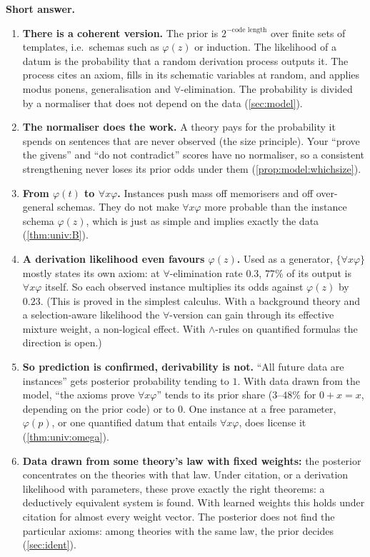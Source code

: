 \begin{framed}\small
\noindent\textbf{Short answer.}
\begin{enumerate}[label=\arabic*.,leftmargin=*,itemsep=0.5pt,topsep=1pt]
\item \textbf{There is a coherent version.} The prior is $2^{-\text{code length}}$ over finite sets of templates, i.e.\ schemas such as $\varphi(z)$ or induction. The likelihood of a datum is the probability that a random derivation process outputs it. The process cites an axiom, fills in its schematic variables at random, and applies modus ponens, generalisation and $\forall$-elimination. The probability is divided by a normaliser that does not depend on the data (\cref{sec:model}).
\item \textbf{The normaliser does the work.} A theory pays for the probability it spends on sentences that are never observed (the size principle). Your ``prove the givens'' and ``do not contradict'' scores have no normaliser, so a consistent strengthening never loses its prior odds under them (\cref{prop:model:whichsize}).
\item \textbf{From $\varphi(t)$ to $\forall x\varphi$.} Instances push mass off memorisers and off over-general schemas. They do not make $\forall x\varphi$ more probable than the instance schema $\varphi(z)$, which is just as simple and implies exactly the data (\cref{thm:univ:B}).
\item \textbf{A derivation likelihood even favours $\varphi(z)$.} Used as a generator, $\{\forall x\varphi\}$ mostly states its own axiom: at $\forall$-elimination rate $0.3$, $77\%$ of its output is $\forall x\varphi$ itself. So each observed instance multiplies its odds against $\varphi(z)$ by $0.23$. (This is proved in the simplest calculus. With a background theory and a selection-aware likelihood the $\forall$-version can gain through its effective mixture weight, a non-logical effect. With $\wedge$-rules on quantified formulas the direction is open.)
\item \textbf{So prediction is confirmed, derivability is not.} ``All future data are instances'' gets posterior probability tending to $1$. With data drawn from the model, ``the axioms prove $\forall x\varphi$'' tends to its prior share ($3$--$48\%$ for $0+x=x$, depending on the prior code) or to $0$. One instance at a free parameter, $\varphi(p)$, or one quantified datum that entails $\forall x\varphi$, does license it (\cref{thm:univ:omega}).
\item \textbf{Data drawn from some theory's law with fixed weights:} the posterior concentrates on the theories with that law. Under citation, or a derivation likelihood with parameters, these prove exactly the right theorems: a deductively equivalent system is found. With learned weights this holds under citation for almost every weight vector. The posterior does not find the particular axioms: among theories with the same law, the prior decides (\cref{sec:ident}).

\end{enumerate}
\end{framed}

